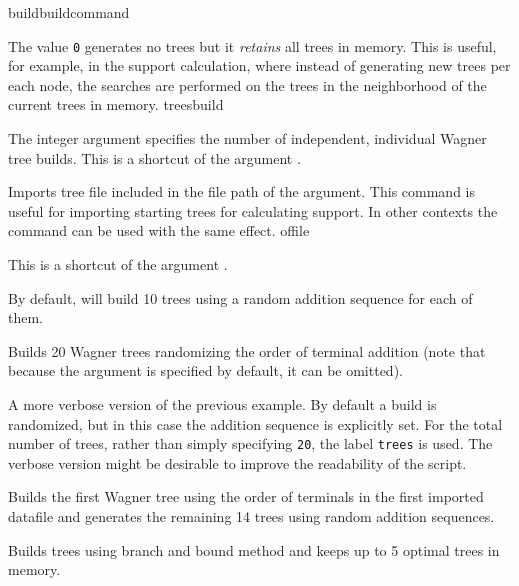 \begin{command}{build}{buildcommand}
\begin{arguments}
{            The value \texttt{0} generates no trees but it \emph{retains} all trees in memory.
            This is useful, for example, in the  support calculation,
            where instead of generating new trees per each node, the searches are
            performed on the trees in the neighborhood of the current trees in memory.}
            {treesbuild}

            {The integer argument specifies the number of independent, individual
            Wagner tree builds. This is a shortcut of the argument .}
            {}

            {Imports tree file included in the file path of the argument. This command is
            useful for importing starting trees for calculating  support.
            In other contexts the command  can be used with the same effect.}
            {offile}

            {This is a shortcut of the argument .}
            {}

   \end{arguments}
      
       {By default, \poy will build 10 trees using a random addition sequence for
       each of them.}

	\begin{poyexamples}
            {Builds 20 Wagner trees randomizing the order of terminal
            addition (note that because the argument  is specified by default, 
            it can be omitted).}

            {A more verbose version of the previous example. By default a build
            is randomized, but in this case the addition sequence is explicitly
            set. For the total number of trees, rather than simply specifying \texttt{20},
            the label \texttt{trees} is used. The verbose version might be desirable
            to improve the readability of the script.}

            {Builds the first Wagner tree using the order of terminals in the first
            imported datafile and generates the remaining
            14 trees using random addition sequences.}
            
            {Builds trees using branch and bound method and keeps up to
            5 optimal trees in memory.}
            
	\end{poyexamples}

\end{command}

